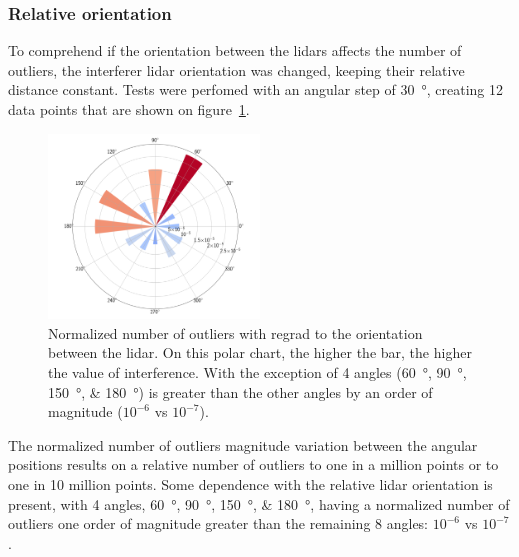 \subsubsection{Relative orientation}
To comprehend if the orientation between the \acp{lidar} affects the number of outliers, the interferer \ac{lidar} orientation was changed, keeping their relative distance constant. Tests were perfomed with an angular step of \SI{30}{\degree}, creating 12 data points that are shown on figure~\ref{fig:box-filter-outliers-direction}.

\begin{figure}[!ht]
	\centering
	\includegraphics[width=0.5\textwidth]{img/lidar-interference/box-filtering/interference-box-filter-outliers-direction.png}
	\caption{Normalized number of outliers with regrad to the orientation between the \ac{lidar}. On this polar chart, the higher the bar, the higher the value of interference. With the exception of 4 angles (\SIlist[list-final-separator = {, }]{60; 90; 150; 180}{\degree}) is greater than the other angles by an order of magnitude ($10^{-6}$ vs $10^{-7}$).}
	\label{fig:box-filter-outliers-direction}
\end{figure}

The normalized number of outliers magnitude variation between the angular positions results on a relative number of outliers to one in a million points or to one in 10 million points. Some dependence with the relative \ac{lidar} orientation is present, with 4 angles, \SIlist[list-final-separator = {, }]{60; 90; 150; 180}{\degree}, having a normalized number of outliers one order of magnitude greater than the remaining 8 angles: $10^{-6}$ vs $10^{-7}$.




